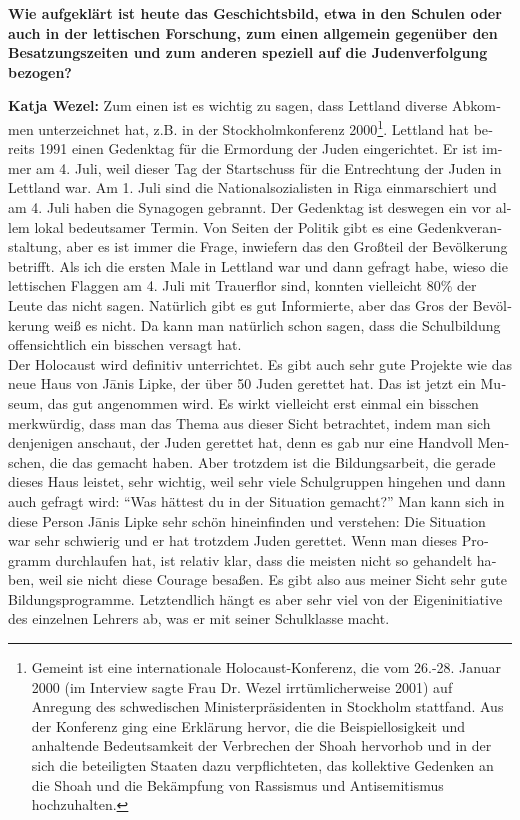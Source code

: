 \begin{otherlanguage}{ngerman}
\textbf{Wie aufgeklärt ist heute das Geschichtsbild, etwa in den Schulen oder auch in der lettischen Forschung, zum einen allgemein gegenüber den Besatzungszeiten und zum anderen speziell auf die Judenverfolgung bezogen?} 

\textbf{Katja Wezel:} Zum einen ist es wichtig zu sagen, dass Lettland diverse Abkommen unterzeichnet hat, z.B. in der Stockholmkonferenz 2000\footnote{Gemeint ist eine internationale Holocaust-Konferenz, die vom 26.-28. Januar 2000 (im Interview sagte Frau Dr. Wezel irrtümlicherweise 2001) auf Anregung des schwedischen Ministerpräsidenten in Stockholm stattfand. Aus der Konferenz ging eine Erklärung hervor, die die Beispiellosigkeit und anhaltende Bedeutsamkeit der Verbrechen der Shoah hervorhob und in der sich die beteiligten Staaten dazu verpflichteten, das kollektive Gedenken an die Shoah und die Bekämpfung von Rassismus und Antisemitismus hochzuhalten.}. Lettland hat bereits 1991 einen Gedenktag für die Ermordung der Juden eingerichtet. Er ist immer am 4. Juli, weil dieser Tag der Startschuss für die Entrechtung der Juden in Lettland war. Am 1. Juli sind die Nationalsozialisten in Riga einmarschiert und am 4. Juli haben die Synagogen gebrannt. Der Gedenktag ist deswegen ein vor allem lokal bedeutsamer Termin. Von Seiten der Politik gibt es eine Gedenkveranstaltung, aber es ist immer die Frage, inwiefern das den Großteil der Bevölkerung betrifft. Als ich die ersten Male in Lettland war und dann gefragt habe, wieso die lettischen Flaggen am 4. Juli mit Trauerflor sind, konnten vielleicht 80\% der Leute das nicht sagen. Natürlich gibt es gut Informierte, aber das Gros der Bevölkerung weiß es nicht. Da kann man natürlich schon sagen, dass die Schulbildung offensichtlich ein bisschen versagt hat.\\ 
Der Holocaust wird definitiv unterrichtet. Es gibt auch sehr gute Projekte wie das neue Haus von Jānis Lipke, der über 50 Juden gerettet hat. Das ist jetzt ein Museum, das gut angenommen wird. Es wirkt vielleicht erst einmal ein bisschen merkwürdig, dass man das Thema aus dieser Sicht betrachtet, indem man sich denjenigen anschaut, der Juden gerettet hat, denn es gab nur eine Handvoll Menschen, die das gemacht haben. Aber trotzdem ist die Bildungsarbeit, die gerade dieses Haus leistet, sehr wichtig, weil sehr viele Schulgruppen hingehen und dann auch gefragt wird: ``Was hättest du in der Situation gemacht?'' Man kann sich in diese Person Jānis Lipke sehr schön hineinfinden und verstehen: Die Situation war sehr schwierig und er hat trotzdem Juden gerettet. Wenn man dieses Programm durchlaufen hat, ist relativ klar, dass die meisten nicht so gehandelt haben, weil sie nicht diese Courage besaßen. Es gibt also aus meiner Sicht sehr gute Bildungsprogramme. Letztendlich hängt es aber sehr viel von der Eigeninitiative des einzelnen Lehrers ab, was er mit seiner Schulklasse macht. 

\end{otherlanguage}
